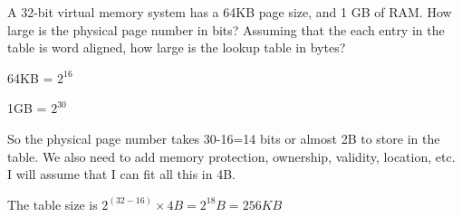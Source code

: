 A 32-bit virtual memory system has a 64KB page size, and 1 GB of RAM.  How large is the physical page number in bits? Assuming that the each entry in the table is word aligned, how large is the lookup table in bytes?

{\color{ans}
64KB = $2^{16}$

1GB = $2^{30}$

So the physical page number takes 30-16=14 bits or almost 2B to store in the table.  We also need to add memory protection, ownership, validity, location, etc.  I will assume that I can fit all this in 4B.

The table size is $2^{(32-16)}\times 4 B = 2^{18} B = 256 KB$
} 
